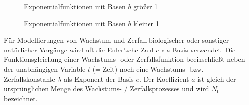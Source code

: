 \begin{figure}[h!]
	\begin{floatrow}
		\ffigbox
		{
		} {\caption*{Exponentialfunktionen mit Basen $b$ gr\"{o}\ss{}er 1}}

		\ffigbox
		{
		} {\caption*{Exponentialfunktionen mit Basen $b$ kleiner 1}}
	\end{floatrow}
\end{figure}

\pagebreak

F\"{u}r Modellierungen von Wachstum und Zerfall biologischer oder sonstiger nat\"{u}rlicher Vorg\"{a}nge wird oft die Euler'sche Zahl $e$ als Basis verwendet. Die Funktionsgleichung einer Wachstums- oder Zerfallsfunktion beeinschlie\ss{}t neben der unabh\"{a}ngigen Variable $t$ (= Zeit) noch eine Wachstums- bzw. Zerfallskonstante $\lambda$ als Exponent der Basis $e$. Der Koeffizient $a$ ist gleich der urspr\"{u}nglichen Menge des Wachstums- / Zerfallsprozesses und wird $N_{0}$ bezeichnet. 

